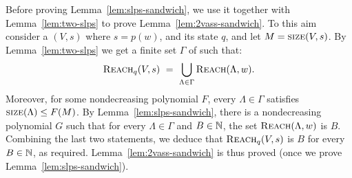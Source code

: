 \begin{appendixproof}
Before proving Lemma~\ref{lem:slps-sandwich}, we use it together with Lemma~\ref{lem:two-slps}
to prove Lemma~\ref{lem:2vass-sandwich}.
%
To this aim consider a \dvass $(V, s)$ where $s=p(w)$, and its state $q$, and let $M=\textsc{size}(V,s)$.
By Lemma~\ref{lem:two-slps} we get a finite set $\Gamma$ of \dslps such that:
\[
\reach_q(V,s) \ = \ \bigcup_{\Lambda \in \Gamma} \reach(\Lambda, w).
\]
Moreover, for some nondecreasing polynomial $F$, every $\Lambda \in \Gamma$ satisfies
$\textsc{size}(\Lambda) \leq F(M)$.
By Lemma~\ref{lem:slps-sandwich}, there is a nondecreasing polynomial $G$
such that for every $\Lambda \in \Gamma$ and $B\in\mathbb{N}$, 
the set $\textsc{Reach}(\Lambda,w)$
is 
 {$B$}.
Combining the last two statements, we deduce that $\textsc{Reach}_q(V, s)$ is
 {$B$} for every $B\in\mathbb{N}$, as required.
%
Lemma~\ref{lem:2vass-sandwich} is thus proved (once we prove
Lemma~\ref{lem:slps-sandwich}).
\end{appendixproof}

